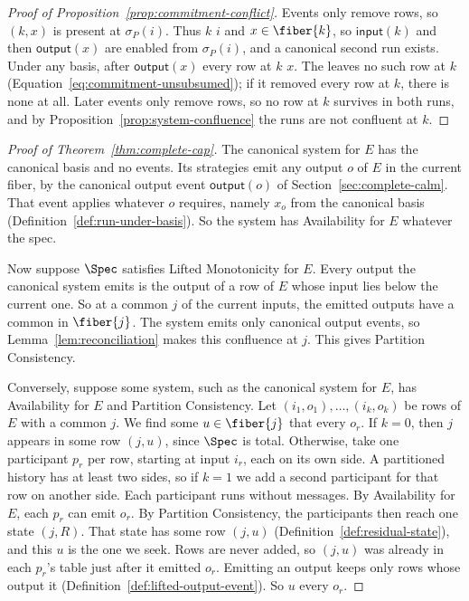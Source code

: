 \begin{proof}[Proof of Proposition~\ref{prop:commitment-conflict}]
Events only remove rows, so $(k,x)$ is present at $\sigma_P(i)$.  Thus $k$
\inrel $i$ and $x\in\fiber{k}$, so $\mathsf{input}(k)$ and then
$\mathsf{output}(x)$ are enabled from $\sigma_P(i)$, and a canonical second
run exists.  Under any basis, after $\mathsf{output}(x)$ every row at $k$
\outrel $x$.  The
\commitment leaves no such row at $k$
(Equation~\ref{eq:commitment-unsubsumed}); if it removed every row at $k$,
there is none at all.  Later events only remove rows, so no row at $k$
survives in both runs, and by Proposition~\ref{prop:system-confluence} the
runs are not confluent at $k$.
\end{proof}

\begin{proof}[Proof of Theorem~\ref{thm:complete-cap}]
The canonical system for $E$ has the canonical basis and no \commitment
events.  Its strategies emit any output $o$ of $E$ in the current fiber, by
the canonical output event $\mathsf{output}(o)$ of
Section~\ref{sec:complete-calm}.  That event applies whatever \commitment $o$
requires, namely $x_o$ from the canonical basis
(Definition~\ref{def:run-under-basis}).  So the system has Availability for
$E$ whatever the spec.

Now suppose $\Spec$ satisfies Lifted Monotonicity for $E$.  Every output the
canonical system emits is the output of a row of $E$ whose input lies below
the current one.  So at a common \indesc $j$ of the current inputs, the
emitted outputs have a common \outnoun in $\fiber{j}$.  The system emits only
canonical output events, so Lemma~\ref{lem:reconciliation} makes this
confluence at $j$.  This gives Partition Consistency.

Conversely, suppose some system, such as the canonical system for $E$, has
Availability for $E$ and Partition Consistency.  Let
$(i_1,o_1),\ldots,(i_k,o_k)$ be rows of $E$ with a common \indesc $j$.  We
find some $u\in\fiber{j}$ that \outrel every $o_r$.  If $k=0$, then $j$
appears in some row $(j,u)$, since $\Spec$ is total.  Otherwise, take one
participant $p_r$ per row, starting at input $i_r$, each on its own side.  A
partitioned history has at least two sides, so if $k=1$ we add a second
participant for that row on another side.  Each participant runs without
messages.  By Availability for $E$, each $p_r$ can emit $o_r$.  By Partition
Consistency, the participants then reach one state $(j,R)$.  That state has
some row $(j,u)$ (Definition~\ref{def:residual-state}), and this $u$ is the
one we seek.  Rows are never added, so $(j,u)$ was already in each $p_r$'s
table just after it emitted $o_r$.  Emitting an output keeps only rows whose
output \outrel it (Definition~\ref{def:lifted-output-event}).  So $u$ \outrel
every $o_r$.
\end{proof}

